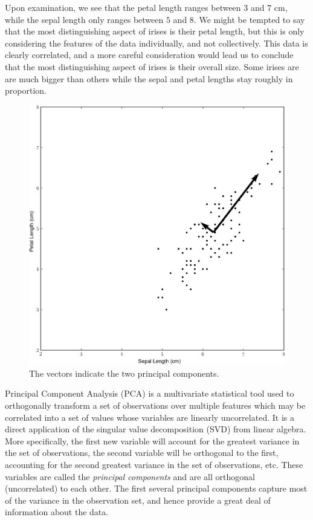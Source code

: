 Upon examination, we see that the petal length ranges between $3$ and $7$ cm, while the sepal length only ranges between $5$ and $8$. We might be tempted to say that the most distinguishing aspect of irises is their petal length, but this is only considering the features of the data individually, and not collectively. This data is clearly correlated, and a more careful consideration would lead us to conclude that the most distinguishing aspect of irises is their overall size. Some irises are are much bigger than others while the sepal and petal lengths stay roughly in proportion.
\begin{figure}
\includegraphics[width=\textwidth]{iris2.pdf}
\caption{The vectors indicate the two principal components.}
\label{fig:iris_2}
\end{figure}

Principal Component Analysis (PCA) is a multivariate statistical tool used to orthogonally transform a set of observations over multiple features which may be correlated into a set of values whose variables are linearly uncorrelated. It is a direct application of the singular value decomposition (SVD) from linear algebra. More specifically, the first new variable will account for the greatest variance in the set of observations, the second variable will be orthogonal to the first, accounting for the second greatest variance in the set of observations, etc. These variables are called the \emph{principal components} and are all orthogonal (uncorrelated) to each other. The first several principal components capture most of the variance in the observation set, and hence provide a great deal of information about the data. 


